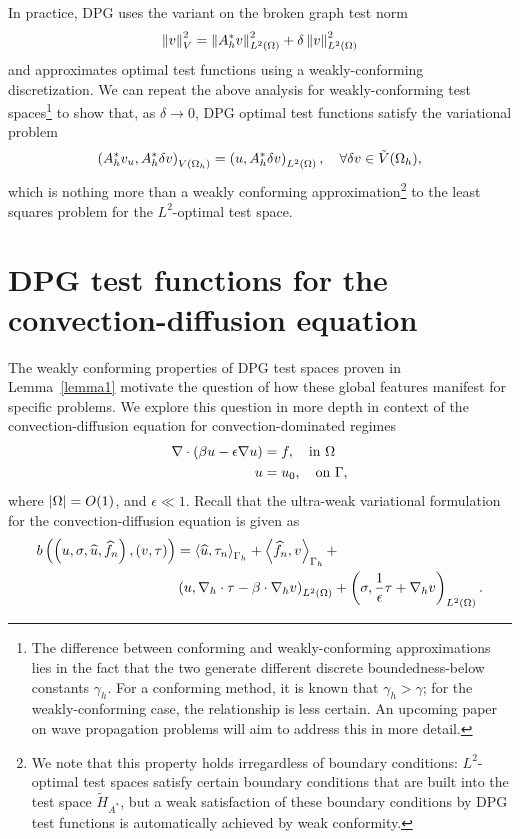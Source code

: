 In practice, DPG uses the variant on the broken graph test norm
\[
\nor{v}_{V}^2 = \nor{A_h^*v}_{\L}^2 + \delta \nor{v}_{\L}^2
\]
and approximates optimal test functions using a weakly-conforming discretization.  We can repeat the above analysis for weakly-conforming test spaces\footnote{The difference between conforming and weakly-conforming approximations lies in the fact that the two generate different discrete boundedness-below constants $\gamma_h$.  For a conforming method, it is known that $\gamma_h > \gamma$; for the weakly-conforming case, the relationship is less certain.  An upcoming paper on wave propagation problems will aim to address this in more detail.} to show that, as $\delta \rightarrow 0$, DPG optimal test functions satisfy the variational problem
\[
\LRp{A_h^* v_u, A_h^* \delta v}_{V(\Omega_h)} = \LRp{u,A_h^* \delta v}_{L^2(\Omega)}, \quad \forall \delta v \in \tilde{V}(\Oh),
\]
which is nothing more than a weakly conforming approximation\footnote{We note that this property holds irregardless of boundary conditions: $L^2$-optimal test spaces satisfy certain boundary conditions that are built into the test space $\tilde{H}_{A^*}$, but a weak satisfaction of these boundary conditions by DPG test functions is automatically achieved by weak conformity.} to the least squares problem for the $L^2$-optimal test space.


\section{DPG test functions for the convection-diffusion equation}

The weakly conforming properties of DPG test spaces proven in Lemma~\ref{lemma1} motivate the question of how these global features manifest for specific problems.  We explore this question in more depth in context of the convection-diffusion equation for convection-dominated regimes
\begin{align*}
\div\LRp{\beta u - \epsilon \grad u} &= f, \quad \text{in } \Omega \\
u &= u_{0}, \quad \text{on } \Gamma, 
\end{align*}
where $\LRb{\Omega} = O(1)$, and $\epsilon \ll 1$.  Recall that the ultra-weak variational formulation for the convection-diffusion equation is given as
\begin{align*}
b\LRp{\LRp{u,\sigma, \uh, \fnh}, \LRp{v,\tau}} &= \LRa{\uh,\tau_n}_{\Gh} + \LRa{\fnh,v}_{\Gh}+ \\ & \LRp{u, \Grad_h\cdot \tau - \beta\cdot \Grad_h v}_{L^2\LRp{\Omega}} + \LRp{\sigma, \frac{1}{\epsilon}\tau + \Grad_h v}_{L^2\LRp{\Omega}}.
\end{align*}

